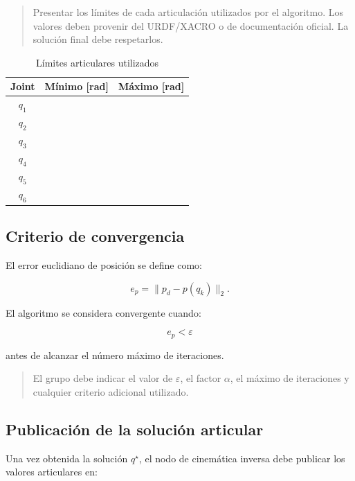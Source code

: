 \documentclass[journal]{IEEEtran}
\newcommand{\instr}[1]{%
\begin{quote}
\small
\noindent\textbf{\color{blue}{INSTRUCCIÓN:}} #1
\end{quote}
}
\newcommand{\pendiente}[1]{\textbf{\color{red}{[#1]}}}
\begin{document}
\instr{Presentar los límites de cada articulación utilizados por el algoritmo. Los valores deben provenir del URDF/XACRO o de documentación oficial. La solución final debe respetarlos.}

\begin{table}[H]
\centering
\caption{Límites articulares utilizados}
\begin{tabular}{ccc}
\toprule
\textbf{Joint} & \textbf{Mínimo [rad]} & \textbf{Máximo [rad]}\\
\midrule
$q_1$ & \pendiente{...} & \pendiente{...}\\
$q_2$ & \pendiente{...} & \pendiente{...}\\
$q_3$ & \pendiente{...} & \pendiente{...}\\
$q_4$ & \pendiente{...} & \pendiente{...}\\
$q_5$ & \pendiente{...} & \pendiente{...}\\
$q_6$ & \pendiente{...} & \pendiente{...}\\
\bottomrule
\end{tabular}
\end{table}

\subsection{Criterio de convergencia}

El error euclidiano de posición se define como:

\begin{equation}
e_p =
\|p_d-p(q_k)\|_2.
\end{equation}

El algoritmo se considera convergente cuando:

\begin{equation}
e_p < \varepsilon
\end{equation}

antes de alcanzar el número máximo de iteraciones.

\instr{El grupo debe indicar el valor de $\varepsilon$, el factor $\alpha$, el máximo de iteraciones y cualquier criterio adicional utilizado.}

\subsection{Publicación de la solución articular}

Una vez obtenida la solución $q^\star$, el nodo de cinemática inversa debe publicar los valores articulares en:
\end{document}
